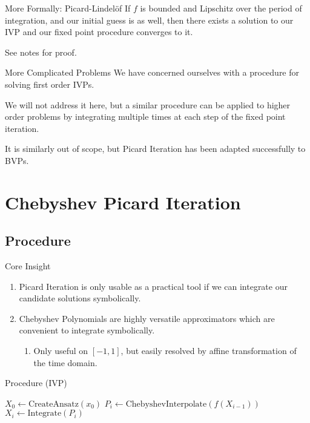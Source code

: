 \documentclass[pdf]{beamer}
\begin{document}
\begin{frame}{More Formally: Picard-Lindel\"of}
  If $f$ is bounded and Lipschitz over the period of integration, and our
  initial guess is as well, then there exists a solution to our IVP and our fixed
  point procedure converges to it.\newline

  See notes for proof.
\end{frame}

\begin{frame}{More Complicated Problems}
  We have concerned ourselves with a procedure for solving first order IVPs.\newline

  We will not address it here, but a similar procedure can be applied to higher order
  problems by integrating multiple times at each step of the fixed point iteration.\newline

  It is similarly out of scope, but Picard Iteration has been adapted successfully to BVPs.
\end{frame}

\section{Chebyshev Picard Iteration}
\subsection{Procedure}
\begin{frame}{Core Insight}
  \begin{enumerate}
    \item Picard Iteration is only usable as a practical tool if we can
      integrate our candidate solutions symbolically.
    \item Chebyshev Polynomials are highly versatile approximators which
      are convenient to integrate symbolically.
      \begin{enumerate}
      \item Only useful on $[-1,1]$, but easily resolved by affine
        transformation of the time domain.
      \end{enumerate}
  \end{enumerate} 
\end{frame}  

\begin{frame}{Procedure (IVP)}
  \begin{algorithmic}
    \State $X_0 \gets \text{CreateAnsatz}(x_0)$
    \For{$i \in [1,\infty)$}
      \State $P_i \gets \text{ChebyshevInterpolate}(f(X_{i-1}))$
      \State $X_i \gets \text{Integrate}(P_i)$
      \State \Return
      \EndIf
    \EndFor
    \EndProcedure  
  \end{algorithmic}
\end{frame}  
\end{document}
